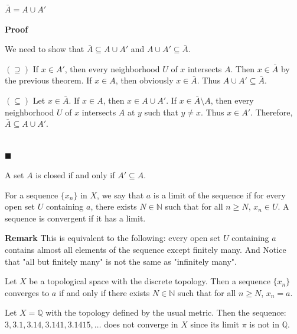 \documentclass[main.tex]{subfiles}
\begin{document}
\begin{theorem}
    $\bar{A} = A \cup A'$
\end{theorem}
\par \noindent \textbf{Proof} 
\par We need to show that $\bar{A} \subseteq A \cup A'$ and $A \cup A' \subseteq \bar{A}$.
\par $(\supseteq)$ If $x\in A'$, then every neighborhood $U$ of $x$ intersects $A$. Then $x\in \bar{A}$ by the previous theorem. If $x\in A$, then obviously $x\in \bar{A}$. Thus $A \cup A' \subseteq \bar{A}$.
\par $(\subseteq)$ Let $x\in \bar{A}$. If $x\in A$, then $x\in A \cup A'$. If $x \in \bar{A}\setminus A$, then every neighborhood $U$ of $x$ intersects $A$ at $y$ such that $y \neq x$. Thus $x\in A'$. Therefore, $\bar{A} \subseteq A \cup A'$.

\mbox{} \\ \null \hfill $\blacksquare$ 

\begin{corollary}
    A set $A$ is closed if and only if $A' \subseteq A$.
\end{corollary}

\begin{definition}
    For a sequence $\{ x_n \}$ in $X$, we say that $a$ is a limit of the sequence if for every open set $U$ containing $a$, there exists $N \in \mathbb{N}$ such that for all $n \geq N$, $x_n \in U$. A sequence is convergent if it has a limit.
\end{definition}

\par \noindent \textbf{Remark} This is equivalent to the following: every open set $U$ containing $a$ contains almost all elements of the sequence except finitely many. And Notice that "all but finitely many" is not the same as "infinitely many".

\begin{example}
    Let $X$ be a topological space with the discrete topology. Then a sequence $\{ x_n \}$ converges to $a$ if and only if there exists $N \in \mathbb{N}$ such that for all $n \geq N$, $x_n = a$.
\end{example}

\begin{example}
    Let $X = \mathbb{Q}$ with the topology defined by the usual metric. Then the sequence: $3, 3.1, 3.14, 3.141, 3.1415, \ldots$ does not converge in $X$ since its limit $\pi$ is not in $\mathbb{Q}$.
\end{example}
\end{document}
